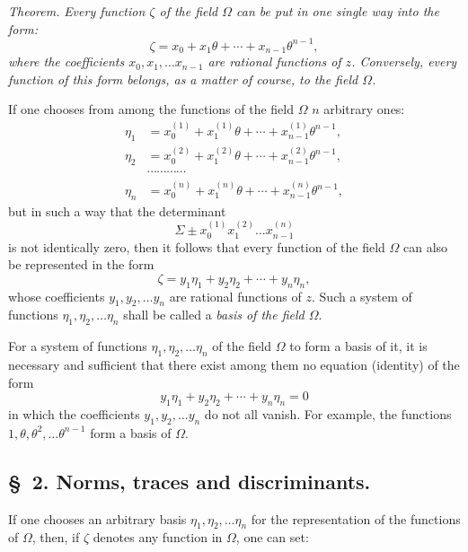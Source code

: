 \documentclass{article}
\begin{document}
\emph{Theorem.} \emph{Every function $\zeta$ of the field $\Omega$ can be put in one single way into the form:}
\[ \zeta = x_{0} + x_{1}\theta + \cdots + x_{n-1}\theta^{n-1}, \]
\emph{where the coefficients $x_{0}, x_{1}, \ldots x_{n-1}$ are rational functions of $z$. Conversely, every function of this form belongs, as a matter of course, to the field $\Omega$.}

If one chooses from among the functions of the field $\Omega$ $n$ arbitrary ones:
\[ \begin{aligned} \eta_{1} &= x_{0}^{(1)} + x_{1}^{(1)}\theta + \cdots + x_{n-1}^{(1)}\theta^{n-1}, \\ \eta_{2} &= x_{0}^{(2)} + x_{1}^{(2)}\theta + \cdots + x_{n-1}^{(2)}\theta^{n-1}, \\ &\cdots\cdots\cdots\cdots \\ \eta_{n} &= x_{0}^{(n)} + x_{1}^{(n)}\theta + \cdots + x_{n-1}^{(n)}\theta^{n-1}, \end{aligned} \]
but in such a way that the determinant
\[ \Sigma \pm x_{0}^{(1)} x_{1}^{(2)} \ldots x_{n-1}^{(n)} \]
is not identically zero, then it follows that every function of the field $\Omega$ can also be represented in the form
\[ \zeta = y_{1}\eta_{1} + y_{2}\eta_{2} + \cdots + y_{n}\eta_{n}, \]
whose coefficients $y_{1}, y_{2}, \ldots y_{n}$ are rational functions of $z$. Such a system of functions $\eta_{1}, \eta_{2}, \ldots \eta_{n}$ shall be called a \emph{basis of the field $\Omega$}.

For a system of functions $\eta_{1}, \eta_{2}, \ldots \eta_{n}$ of the field $\Omega$ to form a basis of it, it is necessary and sufficient that there exist among them no equation (identity) of the form
\[ y_{1}\eta_{1} + y_{2}\eta_{2} + \cdots + y_{n}\eta_{n} = 0 \]
in which the coefficients $y_{1}, y_{2}, \ldots y_{n}$ do not all vanish. For example, the functions $1, \theta, \theta^{2}, \ldots \theta^{n-1}$ form a basis of $\Omega$.

\subsection*{§~2. Norms, traces and discriminants.}

If one chooses an arbitrary basis $\eta_{1}, \eta_{2}, \ldots \eta_{n}$ for the representation of the functions of $\Omega$, then, if $\zeta$ denotes any function in $\Omega$, one can set:
\end{document}
